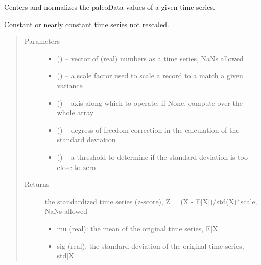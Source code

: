 \documentclass[letterpaper,10pt,english]{sphinxmanual}
\begin{document}

\begin{fulllineitems}
\label{\detokenize{Main:pyleoclim.standardizeTs}}
Centers and normalizes the paleoData values of a  given time series.

Constant or nearly constant time series not rescaled.
\begin{quote}\begin{description}
\item[{Parameters}] \leavevmode\begin{itemize}
\item {} 
 () -- vector of (real) numbers as a time series, NaNs allowed

\item {} 
 () -- a scale factor used to scale a record to a match a given variance

\item {} 
 () -- axis along which to operate, if None, compute over the whole array

\item {} 
 () -- degress of freedom correction in the calculation of the standard deviation

\item {} 
 () -- a threshold to determine if the standard deviation is too close to zero

\end{itemize}

\item[{Returns}] \leavevmode

the standardized time series (z-score), Z = (X - E{[}X{]})/std(X)*scale, NaNs allowed
\begin{itemize}
\item {} 
mu (real): the mean of the original time series, E{[}X{]}

\item {} 
sig (real): the standard deviation of the original time series, std{[}X{]}


\end{itemize}
\end{description}
\end{quote}
\end{fulllineitems}
\end{document}

